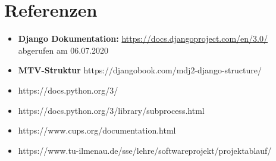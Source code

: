 \section{Referenzen}
\begin{itemize}
    \item \textbf{Django Dokumentation:} \href{https://docs.djangoproject.com/en/3.0/}{https://docs.djangoproject.com/en/3.0/} abgerufen am 06.07.2020
    \item \textbf{MTV-Struktur} https://djangobook.com/mdj2-django-structure/
    \item https://docs.python.org/3/
    \item https://docs.python.org/3/library/subprocess.html
    \item https://www.cups.org/documentation.html
    \item https://www.tu-ilmenau.de/sse/lehre/softwareprojekt/projektablauf/
\end{itemize}





